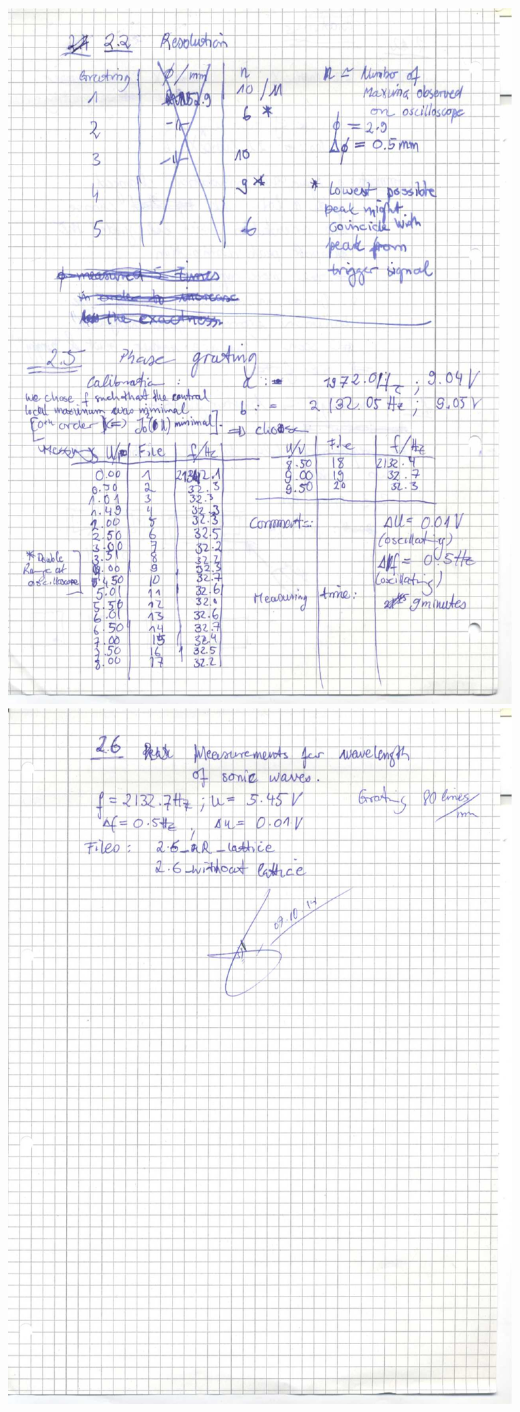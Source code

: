     \includegraphics[width=\linewidth]{appendix/ultra0004.jpg}
    \clearpage
    \includegraphics[width=\linewidth]{appendix/ultra0005.jpg}
\clearpage
\FloatBarrier

